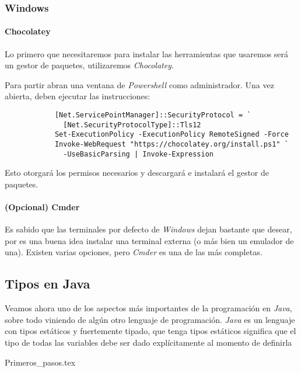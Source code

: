       \subsubsection{Windows}
        \paragraph{Chocolatey}
          Lo primero que necesitaremos para instalar las herramientas que usaremos será un gestor de 
          paquetes, utilizaremos \textit{Chocolatey}.\autocite{choco}

          Para partir abran una ventana de \textit{Powershell} como administrador.
          Una vez abierta, deben ejecutar las instrucciones:
          \begin{verbatim}
            [Net.ServicePointManager]::SecurityProtocol = `
              [Net.SecurityProtocolType]::Tls12
            Set-ExecutionPolicy -ExecutionPolicy RemoteSigned -Force
            Invoke-WebRequest "https://chocolatey.org/install.ps1" `
              -UseBasicParsing | Invoke-Expression
          \end{verbatim}

          Esto otorgará los permisos necesarios y descargará e instalará el gestor de paquetes.
        \paragraph{(Opcional) Cmder}
          Es sabido que las terminales por defecto de \textit{Windows} dejan bastante que desear, 
          por es una buena idea instalar una terminal externa (o más bien un emulador de una).
          Existen varias opciones, pero \textit{Cmder} es una de las más completas.
          


    \subsection{Tipos en Java}
      Veamos ahora uno de los aspectos más importantes de la programación en \textit{Java}, sobre todo
      viniendo de algún otro lenguaje de programación.
      \textit{Java} es un lenguaje con tipos estáticos y fuertemente tipado, que tenga tipos estáticos
      significa que el tipo de todas las variables debe ser dado explícitamente al momento de 
      definirla
    
    {Primeros_pasos.tex}
  \nocite{*}
  \printbibliography[keyword=Por_algo_se_empieza]
